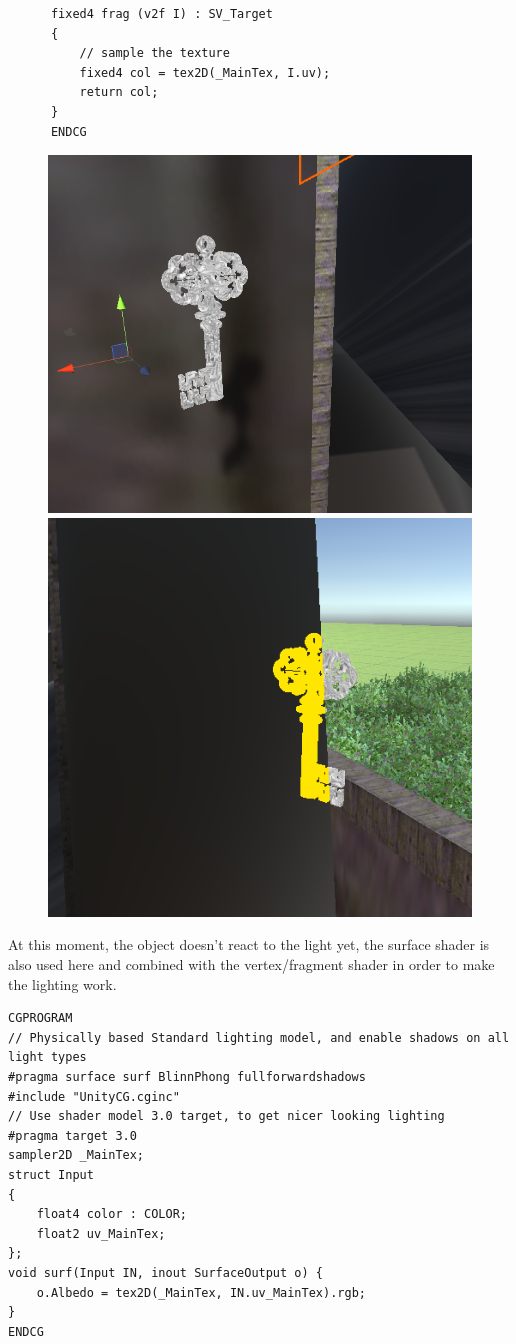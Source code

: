 \documentclass[a4paper, 13pt]{extarticle}
\begin{document}
{\begin{lstlisting}
      fixed4 frag (v2f I) : SV_Target
      {
	      // sample the texture
	      fixed4 col = tex2D(_MainTex, I.uv);
	      return col;
      }
      ENDCG
\end{lstlisting}
\begin{figure}[h]
	\begin{minipage}{.4\textwidth}
		\centering
		\includegraphics[width=0.7\linewidth]{intructions/key_with.png}
		\centering
	\end{minipage}
	\begin{minipage}{.45\textwidth}
		\centering
		\includegraphics[width=0.6\linewidth]{intructions/key_with2.png}
		\centering
	\end{minipage}
\end{figure}
At this moment, the object doesn't react to the light yet, the surface shader is also used here and combined with the vertex/fragment shader in order to make the lighting work.

\begin{lstlisting}
CGPROGRAM
// Physically based Standard lighting model, and enable shadows on all light types
#pragma surface surf BlinnPhong fullforwardshadows
#include "UnityCG.cginc"
// Use shader model 3.0 target, to get nicer looking lighting
#pragma target 3.0
sampler2D _MainTex;
struct Input
{
	float4 color : COLOR;
	float2 uv_MainTex;
};
void surf(Input IN, inout SurfaceOutput o) {
	o.Albedo = tex2D(_MainTex, IN.uv_MainTex).rgb;
}
ENDCG
\end{lstlisting}
\newpage
~
	 \begin{figure}[h]
	

\end{figure}}
\end{document}
